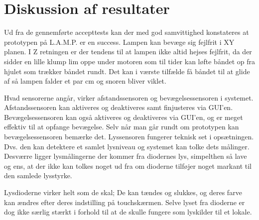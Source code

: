 \chapter{Diskussion af resultater}
Ud fra de gennemførte accepttests kan der med god samvittighed konstateres at prototypen på L.A.M.P. er en success.
Lampen kan bevæge sig fejlfrit i XY planen. I Z retningen er der tendens til at lampen ikke altid hejses fejlfrit, da der sidder en lille klump lim oppe under motoren som til tider kan løfte båndet op fra hjulet som trækker båndet rundt. Det kan i værste tilfælde få båndet til at glide af så lampen falder et par cm og snoren bliver viklet.

Hvad sensorerne angår, virker afstandssensoren og bevægelsessensoren i systemet. Afstandssensoren kan aktiveres og deaktiveres samt finjusteres via GUI'en. Bevægelsessensoren kan også aktiveres og deaktiveres via GUI'en, og er meget effektiv til at opfange bevægelse. Selv når man går rundt om prototypen kan bevægelsessensoren bemærke det.
Lyssensoren fungerer teknisk set i opsætningen. Dvs. den kan detektere et samlet lysniveau og systemet kan tolke dets målinger. Desværre ligger lysmålingerne der kommer fra diodernes lys, simpelthen så lave og ens, at der ikke kan tolkes noget ud fra om dioderne tilføjer noget markant til den samlede lysstyrke.

Lysdioderne virker helt som de skal; De kan tændes og slukkes, og deres farve kan ændres efter deres indstilling på touchskærmen. Selve lyset fra dioderne er dog ikke særlig stærkt i forhold til at de skulle fungere som lyskilder til et lokale.